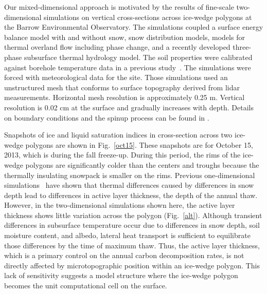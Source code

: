\documentclass[review]{elsarticle}
\begin{document}
Our mixed-dimensional approach is motivated by the results of fine-scale two-dimensional simulations on vertical cross-sections across ice-wedge polygons at the Barrow Environmental Observatory. The simulations coupled a surface energy balance model with and without snow, snow distribution models, models for thermal overland flow including phase change, and a recently developed three-phase subsurface thermal hydrology model. The soil properties were calibrated against borehole temperature data in a previous study~\cite{atchley2015}. The simulations were forced with meteorological data for the site. Those simulations used an unstructured mesh that conforms to surface topography derived from lidar measurements. Horizontal mesh resolution is approximately 0.25 m. Vertical resolution is 0.02 cm at the surface and gradually increases with depth. Details on boundary conditions and the spinup process can be found in \cite{spainter2016integrated}. 

Snapshots of ice and liquid saturation indices in cross-section across two ice-wedge polygons are shown in Fig.~\ref{oct15}. These snapshots are for October 15, 2013, which is during the fall freeze-up. During this period, the rims of the ice-wedge polygons are significantly colder than the centers and troughs because the thermally insulating snowpack is smaller on the rims. Previous one-dimensional simulations~\cite{atchley2016} have shown that thermal differences caused by differences in snow depth lead to differences in active layer thickness, the depth of the annual thaw. However, in the two-dimensional simulations shown here, the active layer thickness shows little variation across the polygon (Fig.~\ref{alt}). Although transient differences in subsurface temperature occur due to differences in snow depth, soil moisture content, and albedo, lateral heat transport is sufficient to equilibrate those differences by the time of maximum thaw. Thus, the active layer thickness, which is a primary control on the annual carbon decomposition rates, is not directly affected by microtopographic position within an ice-wedge polygon. This lack of sensitivity suggests a model structure where the ice-wedge polygon becomes the unit computational cell on the surface. 
\end{document}

